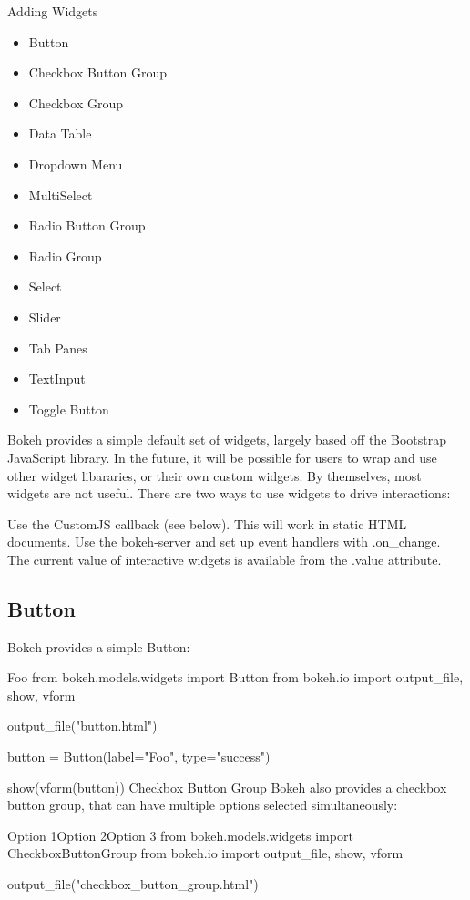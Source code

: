 Adding Widgets


\begin{itemize}
	\item	Button
	\item	Checkbox Button Group
	\item	Checkbox Group
	\item	Data Table
	\item	Dropdown Menu
	\item	MultiSelect
	\item	Radio Button Group
	\item	Radio Group
	\item	Select
	\item	Slider
	\item	Tab Panes
	\item	TextInput
	\item	Toggle Button
\end{itemize}
Bokeh provides a simple default set of widgets, largely based off the Bootstrap JavaScript library. In the future, it will be possible for users to wrap and use other widget libararies, or their own custom widgets. By themselves, most widgets are not useful. There are two ways to use widgets to drive interactions:

Use the CustomJS callback (see below). This will work in static HTML documents.
Use the bokeh-server and set up event handlers with .on_change.
The current value of interactive widgets is available from the .value attribute.

\subsection{Button}
Bokeh provides a simple Button:

Foo
from bokeh.models.widgets import Button
from bokeh.io import output_file, show, vform

output_file("button.html")

button = Button(label="Foo", type="success")

show(vform(button))
Checkbox Button Group
Bokeh also provides a checkbox button group, that can have multiple options selected simultaneously:

Option 1Option 2Option 3
from bokeh.models.widgets import CheckboxButtonGroup
from bokeh.io import output_file, show, vform

output_file("checkbox_button_group.html")

